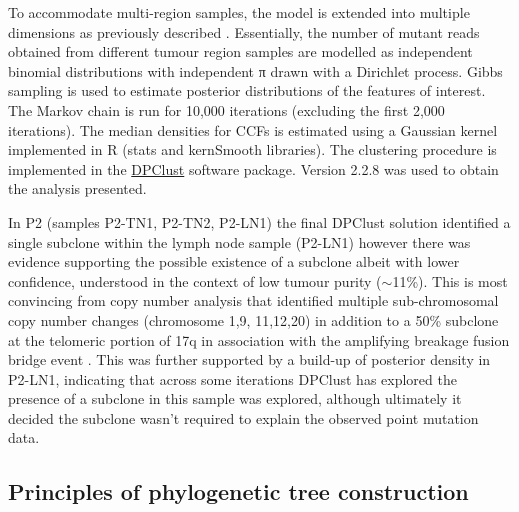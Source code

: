 To accommodate multi-region samples, the model is extended into multiple dimensions as previously described \parencite{Yates2015-xk, Bolli2014-ph}. Essentially, the number of mutant reads obtained from different tumour region samples are modelled as independent binomial distributions with independent π drawn with a Dirichlet process. Gibbs sampling is used to estimate posterior distributions of the features of interest. The Markov chain is run for 10,000 iterations (excluding the first 2,000 iterations). The median densities for \acp{CCF} is estimated using a Gaussian kernel implemented in R (stats and kernSmooth libraries). The clustering procedure is implemented in the \href{https://github.com/Wedge-Oxford/dpclust}{DPClust} software package. Version 2.2.8 was used to obtain the analysis presented.

In P2 (samples P2-TN1, P2-TN2, P2-LN1) the final DPClust solution identified a single subclone within the lymph node sample (P2-LN1) however there was evidence supporting the possible existence of a subclone albeit with lower confidence, understood in the context of low tumour purity ($\sim$11\%). This is most convincing from copy number analysis that identified multiple sub-chromosomal copy number changes (chromosome 1,9, 11,12,20) in addition to a 50\% subclone at the telomeric portion of 17q in association with the  amplifying breakage fusion bridge event . This was further supported by a build-up of posterior density in P2-LN1, indicating that across some iterations DPClust has explored the presence of a subclone in this sample was explored, although ultimately it decided the subclone wasn't required to explain the observed point mutation data.

\subsection{Principles of phylogenetic tree construction}

